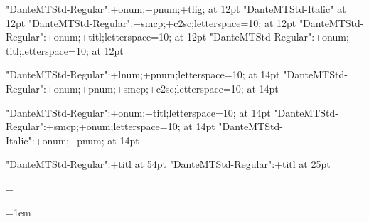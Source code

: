 





\font\twelverm 	"DanteMTStd-Regular":+onum;+pnum;+tlig; at 12pt
\font\twelveit 	"DanteMTStd-Italic" at 12pt
\font\twelvesc 	"DanteMTStd-Regular":+smcp;+c2sc;letterspace=10; at 12pt
\font\twelvetit "DanteMTStd-Regular":+onum;+titl;letterspace=10; at 12pt
\font\twelvetitb "DanteMTStd-Regular":+onum;-titl;letterspace=10; at 12pt


\font\thirteenrm "DanteMTStd-Regular":+lnum;+pnum;letterspace=10; at 14pt
\font\thirteensc "DanteMTStd-Regular":+onum;+pnum;+smcp;+c2sc;letterspace=10; at 14pt

\font\fourteentit "DanteMTStd-Regular":+onum;+titl;letterspace=10; at 14pt
\font\fourteensc "DanteMTStd-Regular":+smcp;+onum;letterspace=10; at 14pt
\font\fourteenit "DanteMTStd-Italic":+onum;+pnum; at 14pt

\font\dccapfont "DanteMTStd-Regular":+titl at 54pt
\font\dcquotefont "DanteMTStd-Regular":+titl at 25pt

\def\secIfontA{\thirteenrm}
\def\secIfontB{\eighteenrm}

\def\secIIfont{\fourteenit}


\def\normalsize{%
	\gdef\rm{\twelverm}%
	\gdef\it{\twelveit}%
	\gdef\sc{\twelvesc}%
	\gdef\tit{\twelvetit}%
}

\def\emph{\it}

\normalsize\rm



\baselineskip=14.06pt

\topskip=\baselineskip

\frenchspacing

\parskip=0pt

\parindent=1em

\lineskiplimit=-1000pt

